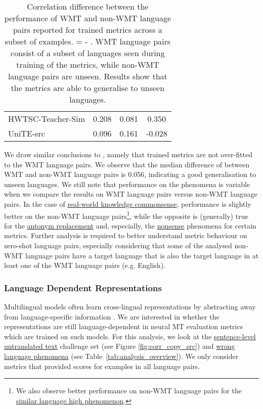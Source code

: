 \documentclass[11pt]{article}
\begin{document}
\begin{table}[h]
{\begin{tabular}{lccc}
HWTSC-Teacher-Sim       & \phantom{-} 0.208  & \phantom{-} 0.081  & \phantom{-} 0.350  \\
UniTE-src               & \phantom{-} 0.096  & \phantom{-} 0.161  & -0.028 \\ \bottomrule
\end{tabular}}
\caption{Correlation difference between the performance of WMT and non-WMT language pairs reported for trained metrics across a subset of examples. =  - . WMT language pairs consist of a subset of languages seen during training of the metrics, while non-WMT language pairs are unseen. Results show that the metrics are able to generalise to unseen languages. }
\label{tab:zero-shot}
\end{table} 
We draw similar conclusions to \citet{kocmi-etal-2021-ship}, namely that trained metrics are not over-fitted to the WMT language pairs. We observe that the median difference of  between WMT and non-WMT language pairs is 0.056, indicating a good generalisation to unseen languages. We still note that performance on the phenomena is variable when we compare the results on WMT language pairs versus non-WMT language pairs. In the case of \hyperref[subsec:real-world-commonsense]{real-world knowledge commonsense}, performance is slightly better on the non-WMT language pairs\footnote{We also observe better performance on non-WMT language pairs for the \hyperref[sec:wrong_language]{similar language high phenomenon}.}, while the opposite is (generally) true for the \hyperref[sec:antonym]{antonym replacement} and, especially, the \hyperref[sec:nonsense]{nonsense} phenomena for certain metrics. Further analysis is required to better understand metric behaviour on zero-shot language pairs, especially considering that some of the analysed non-WMT language pairs have a target language that is also the target language in at least one of the WMT language pairs (e.g. English).


\subsubsection{Language Dependent Representations}
Multilingual models often learn cross-lingual representations by abstracting away from language-specific information \citep{wu-dredze-2019-beto}. We are interested in whether the representations are still language-dependent in neural MT evaluation metrics which are trained on such models. For this analysis, we look at the \hyperref[subsec:sent-untranslated]{sentence-level untranslated text} challenge set (see Figure \ref{fig:corr_copy_src}) and \hyperref[sec:wrong_language]{wrong language phenomena} (see Table~\ref{tab:analysis_overview}).
We only consider metrics that provided scores for examples in all language pairs. 
\end{document}
